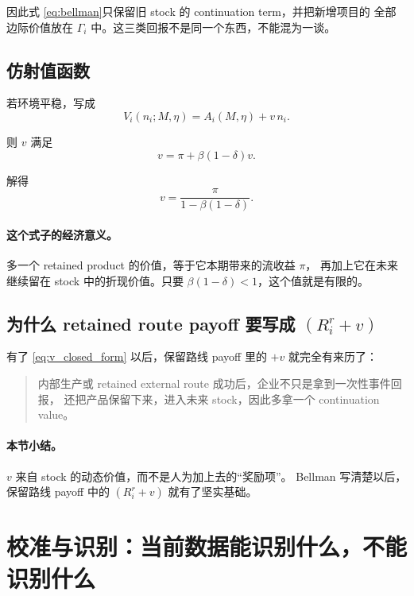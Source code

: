 \documentclass[12pt,UTF8]{ctexart}
\theoremstyle{plain}
\theoremstyle{remark}
\begin{document}
因此式 \eqref{eq:bellman}只保留旧 stock 的 continuation term，并把新增项目的
全部边际价值放在 $\Gamma_i$ 中。这三类回报不是同一个东西，不能混为一谈。

\subsection{仿射值函数}

若环境平稳，写成
\begin{equation}
V_i(n_i;M,\eta)=A_i(M,\eta)+v\,n_i.
\label{eq:affine_value}
\end{equation}

则 $v$ 满足
\begin{equation}
v=\pi+\beta(1-\delta)v.
\label{eq:v_recursion}
\end{equation}

解得
\begin{equation}
v=\frac{\pi}{1-\beta(1-\delta)}.
\label{eq:v_closed_form}
\end{equation}

\paragraph{这个式子的经济意义。}
多一个 retained product 的价值，等于它本期带来的流收益 $\pi$，
再加上它在未来继续留在 stock 中的折现价值。只要
$\beta(1-\delta)<1$，这个值就是有限的。

\subsection{为什么 retained route payoff 要写成 \texorpdfstring{$(R_i^r+v)$}{事件回报加延续价值}}

有了 \eqref{eq:v_closed_form} 以后，保留路线 payoff 里的 $+v$
就完全有来历了：

\begin{quote}
内部生产或 retained external route 成功后，企业不只是拿到一次性事件回报，
还把产品保留下来，进入未来 stock，因此多拿一个 continuation value。
\end{quote}

\paragraph{本节小结。}
$v$ 来自 stock 的动态价值，而不是人为加上去的“奖励项”。
Bellman 写清楚以后，保留路线 payoff 中的 $(R_i^r+v)$ 就有了坚实基础。

\section{校准与识别：当前数据能识别什么，不能识别什么}
\end{document}
